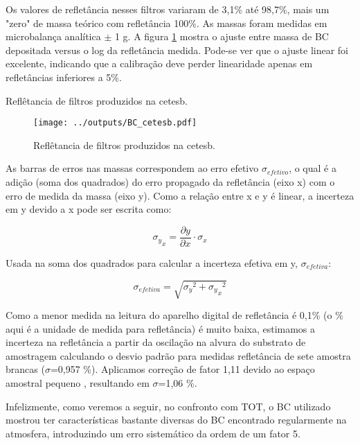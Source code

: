 Os valores de refletância nesses filtros variaram de 3,1\% até 98,7\%, mais um 
"zero" de massa teórico com refletância 100\%. As massas foram medidas em 
microbalança analítica $\pm$ 1 g. A figura \ref{fig:bc_cetesb} mostra o ajuste 
entre massa de BC depositada versus o log da refletância medida. Pode-se ver 
que o ajuste linear foi excelente,
indicando que a calibração deve perder linearidade apenas em refletâncias 
inferiores a 5\%.

\newpage
\begin{table}[H]
	\centering
	\small
	
	\caption{Reflêtancia de filtros produzidos na cetesb. \label{table:bc_cetesb}}
\end{table} 

\begin{figure}[H]
	\centering
	\texttt{[image: ../outputs/BC\_cetesb.pdf]}
	\caption{Reflêtancia de filtros produzidos na cetesb. \label{fig:bc_cetesb}}
\end{figure}

As barras de erros nas massas correspondem ao erro efetivo $\sigma_{efetivo}$, 
o qual é a adição (soma dos quadrados) do erro propagado da refletância (eixo x)
com o erro de medida da massa (eixo y). Como a relação entre x e y é linear, 
a incerteza em y devido a x pode ser escrita como:

\begin{equation}
  {\sigma_y}_x = \frac{\partial y}{\partial x} \cdot \sigma_x
\end{equation} 

Usada na soma dos quadrados para calcular a incerteza efetiva em y, 
$\sigma_{efetiva}$: 

\begin{equation}
  \sigma_{efetiva} = \sqrt{{\sigma_y}^2 + {{\sigma_y}_x}^2}
\end{equation} 

Como a menor medida na leitura do aparelho digital de refletância é 0,1\%
(o \% aqui é a unidade de medida para refletância) é muito baixa, estimamos 
a incerteza na refletância a partir da oscilação na alvura do substrato de 
amostragem calculando o desvio padrão para medidas refletância de sete amostra 
brancas ($\sigma$=0,957 \%). Aplicamos correção de fator 1,11 devido ao 
espaço amostral pequeno \citep{helene1981}, resultando em $\sigma$=1,06 \%.

Infelizmente, como veremos a seguir, no confronto com TOT, o BC utilizado 
mostrou ter características bastante diversas do BC encontrado regularmente 
na atmosfera, introduzindo um erro sistemático da ordem de um fator 5.  


